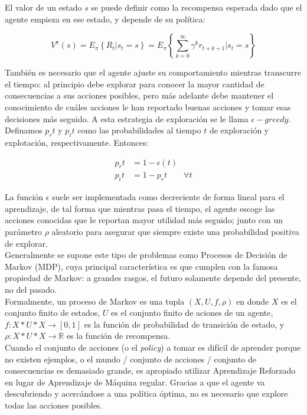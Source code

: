 El valor de un estado $s$ se puede definir como la recompensa esperada dado que el agente empieza en ese estado, y depende de su pol\'itica:

$$
V^{\pi}(s) = E_{\pi}\left\{R_{t}|s_{t} = s\right\} = E_{\pi}\left\{\sum_{k=0}^{\infty}\gamma^{k}r_{t+k+1}|s_{t}=s\right\}
$$

Tambi\'en es necesario que el agente ajuste su comportamiento mientras transcurre el tiempo: al principio debe explorar para conocer la mayor cantidad de consecuencias a sus acciones posibles, pero m\'as adelante debe mantener el conocimiento de cu\'ales acciones le han reportado buenas acciones y tomar esas decisiones m\'as seguido. A esta estrategia de exploraci\'on se le llama $\epsilon-greedy$.\\

Definamos $p_r{t}$ y $p_t{t}$ como las probabilidades al tiempo $t$ de exploraci\'on y explotaci\'on, respectivamente. Entonces:

\vspace{-30pt}
\begin{align*}
p_r{t} &= 1 - \epsilon(t) \\
p_t{t} &= 1 - p_r{t} \quad \quad \forall t
\end{align*}

La funci\'on $\epsilon$ suele ser implementada como decreciente de forma lineal para el aprendizaje,  de tal forma que mientras pasa el tiempo, el agente escoge las acciones conocidas que le reportan mayor utilidad m\'as seguido; junto con un par\'ametro $\rho$ aleatorio para asegurar que siempre existe una probabilidad positiva de explorar.\\

Generalmente se supone este tipo de problemas como Procesos de Decisi\'on de Markov (MDP), cuya principal caracter\'istica es que cumplen con la famosa propiedad de Markov: a grandes rasgos, el futuro solamente depende del presente, no del pasado.\\

Formalmente, un proceso de Markov es una tupla $(X,U,f,\rho)$ en donde $X$ es el conjunto finito de estados, $U$ es el conjunto finito de aciones de un agente, $f:X*U*X\rightarrow[0,1]$ es la funci\'on de probabilidad de transici\'on de estado, y $\rho:X*U*X\rightarrow\mathbb{R}$ es la funci\'on de recompensa. \\

Cuando el conjunto de acciones (o el \textit{policy}) a tomar es dif\'icil de aprender porque no existen ejemplos, o el mundo / conjunto de acciones / conjunto de consecuencias es demasiado grande, es apropiado utilizar Aprendizaje Reforzado en lugar de Aprendizaje de M\'aquina regular. Gracias a que el agente va descubriendo y acerc\'andose a una pol\'itica \'optima, no es necesario que explore todas las acciones posibles. \\

